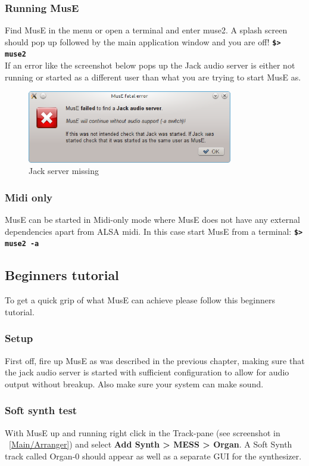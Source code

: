 \documentclass[a4paper]{report}
\newcommand{\shell}[1]{\texttt{\textbf{#1}}}
\newcommand{\menu}[1]{\textbf{#1}}
\newcommand{\screenshotwidth}[0]{0.8\textwidth}
\begin{document}
\subsubsection {Running MusE}
Find MusE in the menu or open a terminal and enter muse2. A splash screen
should pop up followed by the main application window and you are off!
\shell{\$> muse2}\\
If an error like the screenshot below pops up the Jack audio server is
either not running or started as a different user than what you are trying
to start MusE as.
\begin{figure}[htp]
\centering
\includegraphics[width=\screenshotwidth]{pics/no_audio}
\caption{Jack server missing}
\label{fig:no_audio}
\end{figure}
\subsubsection {Midi only}
MusE can be started in Midi-only mode where MusE does not have any external
dependencies apart from ALSA midi. In this case start MusE from a terminal:
\shell{\$> muse2 -a}

\subsection {Beginners tutorial}
To get a quick grip of what MusE can achieve please follow this beginners
tutorial.
\subsubsection {Setup}
First off, fire up MusE as was described in the previous chapter, making
sure that the jack audio server is started with sufficient configuration
to allow for audio output without breakup. Also make sure your system can
make sound.
\subsubsection {Soft synth test}
With MusE up and running right click in the Track-pane (see screenshot in
~\ref{Main/Arranger}) and select \menu{Add Synth > MESS > Organ}. A Soft
Synth track called Organ-0 should appear as well as a separate GUI for
the synthesizer.
\end{document}
